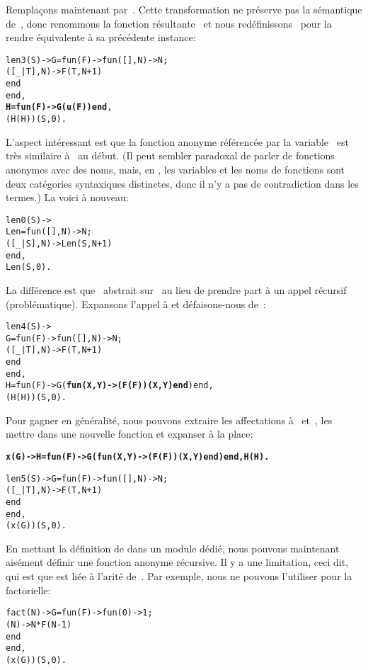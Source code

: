 Remplaçons maintenant  par~. Cette
transformation ne préserve pas la sémantique de~, donc
renommons la fonction résultante~ et nous
redéfinissons~ pour la rendre équivalente à sa précédente
instance:
\begin{alltt}
len3(S) -> G = fun(F) -> fun(   [],N) -> N;
                            ([_|T],N) -> F(T,N+1)
                         end
               end,
           \textbf{H = fun(F) -> G(u(F)) end},
           (H(H))(S,0).
\end{alltt}
L'aspect intéressant est que la fonction anonyme référencée par la
variable~ est très similaire à~ au début. (Il
peut sembler paradoxal de parler de fonctions anonymes avec des noms,
mais, en \Erlang, les variables et les noms de fonctions sont deux
catégories syntaxiques distinctes, donc il n'y a pas de contradiction
dans les termes.) La voici à nouveau:
\begin{alltt}
len0(S) -> 
 Len = fun(   [],N) -> N;
          ([\_|S],N) -> Len(S,N+1)\hfill% \emph{Malheureusement invalide}
       end,
 Len(S,0).
\end{alltt}
La différence est que ~abstrait sur~ au lieu de
prendre part à un appel récursif (problématique). Expansons l'appel à
 et défaisons-nous de~:
\begin{alltt}
len4(S) ->
  G = fun(F) -> fun(   [],N) -> N;
                   ([\_|T],N) -> F(T,N+1)
                end
      end,
  H = fun(F) -> G(\textbf{fun(X,Y) -> (F(F))(X,Y) end}) end,
  (H(H))(S,0).
\end{alltt}
Pour gagner en généralité, nous pouvons extraire les affectations à~ et~, les mettre dans une nouvelle fonction
 et expanser  à la place:
\begin{alltt}
\textbf{x(G) -> H=fun(F) -> G(fun(X,Y)->(F(F))(X,Y) end) end, H(H).}

len5(S) -> G = fun(F) -> fun(   [],N) -> N;
                            ([\_|T],N) -> F(T,N+1)
                         end
               end,
           (x(G))(S,0).
\end{alltt}
En mettant la définition de  dans un module dédié, nous
pouvons maintenant aisément définir une fonction anonyme récursive. Il
y a une limitation, ceci dit, qui est que  est liée à
l'arité de~. Par exemple, nous ne pouvons l'utiliser pour
la factorielle:
\begin{alltt}
fact(N) -> G = fun(F) -> fun(0) -> 1;
                            (N) -> N * F(N-1)
                         end
               end,
           (x(G))(S,0).\hfill% \emph{Arité différente}
\end{alltt}
